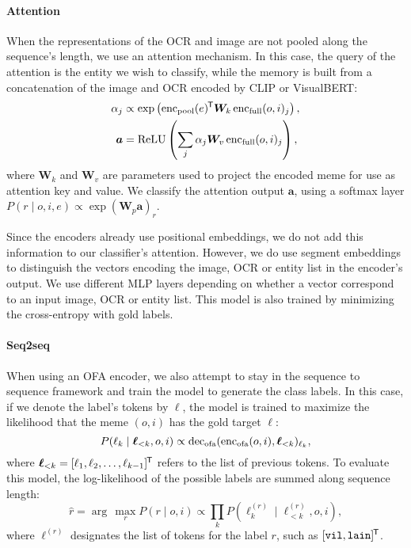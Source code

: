 \paragraph{Attention}
When the representations of the OCR and image are not pooled along the sequence's length, we use an attention mechanism.
In this case, the query of the attention is the entity we wish to classify, while the memory is built from a concatenation of the image and OCR encoded by CLIP or VisualBERT:
\begin{align*}
	\alpha_j & \propto \exp \left( \encoder[pool](e)\transpose{} \bm{W}_k \encoder[full](o, i)_j \right), \\
	\bm{a} & = \operatorname{ReLU}\left(\sum_j \alpha_j \bm{W}_v \encoder[full](o, i)_j\right),
\end{align*}
where \(\bm{W}_k\) and \(\bm{W}_v\) are parameters used to project the encoded meme for use as attention key and value.
We classify the attention output \(\bm{a}\), using a softmax layer \(P(r\mid o, i, e) \propto \exp(\bm{W}_p \bm{a})_r\).

Since the encoders already use positional embeddings, we do not add this information to our classifier's attention.
However, we do use segment embeddings to distinguish the vectors encoding the image, OCR or entity list in the encoder's output. We use different MLP layers depending on whether a vector correspond to an input image, OCR or entity list.
This model is also trained by minimizing the cross-entropy with gold labels.

\paragraph{Seq2seq}
When using an OFA encoder, we also attempt to stay in the sequence to sequence framework and train the model to generate the class labels.
In this case, if we denote the label's tokens by \(\bm{\ell}\), the model is trained to maximize the likelihood that the meme \((o, i)\) has the gold target \(\bm{\ell}\):
\begin{equation*}
	P(\ell_k \mid \bm{\ell}_{<k}, o, i) \propto \decoder[ofa](\encoder[ofa](o, i), \bm{\ell}_{<k})_{\ell_k},
\end{equation*}
where \(\bm{\ell}_{<k} = [\ell_1, \ell_2, \dotsc, \ell_{k-1}]^{\mkern-1.5mu\textsf{T}}\) refers to the list of previous tokens.
To evaluate this model, the log-likelihood of the possible labels are summed along sequence length:
\begin{equation*}
	\hat{r} = \arg\,\max_r P(r \mid o, i) \propto \prod_k P(\ell^{(r)}_k \mid \ell^{(r)}_{<k}, o, i),
\end{equation*}
where \(\bm{\ell}^{(r)}\) designates the list of tokens for the label \(r\), such as \([\texttt{vil}, \texttt{lain}]^{\mkern-1.5mu\textsf{T}}\).


